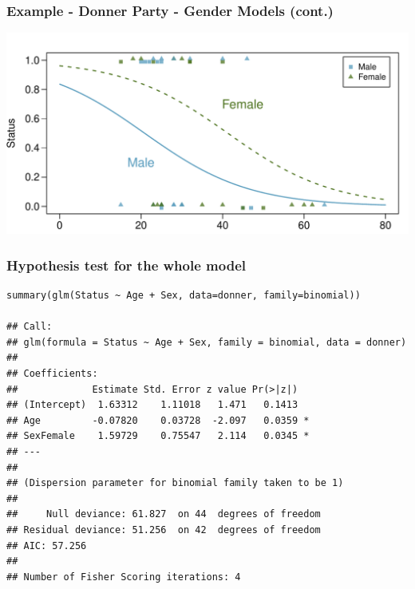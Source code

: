 
\begin{frame}
\frametitle{Example - Donner Party - Gender Models (cont.)}

\begin{center}
\includegraphics[width=\textwidth]{8-4_logistic_reg/figures/donner/donner_scatter_both.pdf}
\end{center}

\end{frame}



\begin{frame}
\frametitle{Hypothesis test for the whole model}
\vspace{-3mm}
{\scriptsize
\begin{verbatim}
summary(glm(Status ~ Age + Sex, data=donner, family=binomial))

## Call:
## glm(formula = Status ~ Age + Sex, family = binomial, data = donner)
## 
## Coefficients:
##             Estimate Std. Error z value Pr(>|z|)  
## (Intercept)  1.63312    1.11018   1.471   0.1413  
## Age         -0.07820    0.03728  -2.097   0.0359 *
## SexFemale    1.59729    0.75547   2.114   0.0345 *
## ---
## 
## (Dispersion parameter for binomial family taken to be 1)
## 
##     Null deviance: 61.827  on 44  degrees of freedom
## Residual deviance: 51.256  on 42  degrees of freedom
## AIC: 57.256
## 
## Number of Fisher Scoring iterations: 4
\end{verbatim}
}

\pause


\end{frame}

